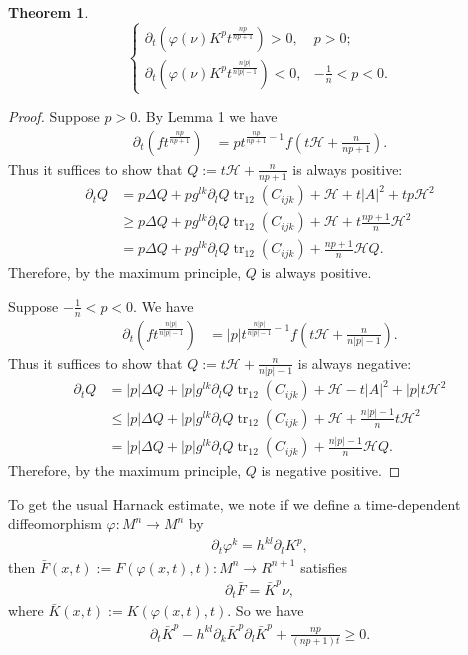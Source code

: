 \documentclass{amsart}
\newtheorem{theorem}{Theorem}
\theoremstyle{definition}
\theoremstyle{remark}
\numberwithin{equation}{section}
\begin{document}
\begin{theorem}
\[\left\{
  \begin{array}{ll}
    \partial_t \left(\varphi(\nu)K^pt^{\frac{n p }{n p +1}}\right)> 0, & p>0; \\
    \partial_t \left(\varphi(\nu)K^pt^{\frac{n |p| }{n |p| -1}}\right)<0, & -\frac{1}{n}<p<0.
  \end{array}
\right.
\]
\end{theorem}
\begin{proof}
Suppose $p>0.$
By Lemma 1 we have
\begin{align*}
\partial_t \left(ft^{\frac{n p }{n p +1}}\right)&= p  t^{\frac{n p }{n p +1}-1}f\left(t\mathcal{H}+\frac{n}{n p +1}\right).
\end{align*}
Thus it suffices to show that $Q:=t\mathcal{H}+\frac{n}{n p +1}$ is always positive:
\begin{align*}
\partial_t Q&= p\Delta Q+ p  g^{lk}\partial_lQ \operatorname{tr}_{12}( C _{ijk})+\mathcal{H}+t| A |^2+  tp \mathcal{H}^2\\
&\geq  p \Delta Q+ p  g^{lk}\partial_lQ \operatorname{tr}_{12}( C _{ijk})+\mathcal{H}+t\frac{n p +1}{n} \mathcal{H}^2\\
&= p \Delta Q+ p  g^{lk}\partial_lQ \operatorname{tr}_{12}( C _{ijk})+\frac{n p +1}{n}\mathcal{H}Q.
\end{align*}
Therefore, by the maximum principle, $Q$ is always positive.


Suppose $-\frac{1}{n}<p<0.$ We have
\begin{align*}
\partial_t \left(ft^{\frac{n |p| }{n |p| -1}}\right)&= |p|  t^{\frac{n |p| }{n |p| -1}-1}f\left(t\mathcal{H}+\frac{n}{n |p| -1}\right).
\end{align*}
Thus it suffices to show that $Q:=t\mathcal{H}+\frac{n}{n |p| -1}$ is always negative:
\begin{align*}
\partial_t Q&= |p| \Delta Q+ |p|  g^{lk}\partial_lQ \operatorname{tr}_{12}( C _{ijk})+\mathcal{H}-t| A |^2+ |p|  t \mathcal{H}^2\\
&\leq  |p| \Delta Q+ |p|  g^{lk}\partial_lQ \operatorname{tr}_{12}( C _{ijk})+\mathcal{H}+\frac{n |p| -1}{n}t \mathcal{H}^2\\
&= |p| \Delta Q+ |p|  g^{lk}\partial_lQ \operatorname{tr}_{12}( C _{ijk})+\frac{n |p| -1}{n}\mathcal{H}Q.
\end{align*}
Therefore, by the maximum principle, $Q$ is negative positive.
\end{proof}

To get the usual Harnack estimate, we note if we define a time-dependent diffeomorphism $\varphi: M^n\to M^n$ by
\begin{align}
\partial_t\varphi^k=h^{kl}\partial_l K^{ p },
\end{align}
then $\bar{F}(x,t):=F(\varphi(x,t),t):M^{n}\to R^{n+1}$ satisfies
\begin{align}
\partial_t\bar{F}=\bar{K}^{ p }\nu,
\end{align}
where $\bar{K}(x,t):=K(\varphi(x,t),t)$. So we have
\begin{align}
\partial_t\bar{K}^{ p }-h^{kl}\partial_k\bar{K}^{ p }\partial_l\bar{K}^{ p }+\frac{n p }{(n p +1)t}\geq 0.
\end{align}



\end{document}
